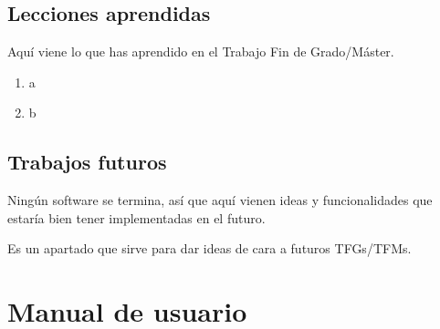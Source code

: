 \documentclass[a4paper, 12pt]{book}
\begin{document}
\section{Lecciones aprendidas}
\label{sec:lecciones_aprendidas}

Aquí viene lo que has aprendido en el Trabajo Fin de Grado/Máster.

\begin{enumerate}
  \item a
  \item b
\end{enumerate}


\section{Trabajos futuros}
\label{sec:trabajos_futuros}

Ningún software se termina, así que aquí vienen ideas y funcionalidades
que estaría bien tener implementadas en el futuro.

Es un apartado que sirve para dar ideas de cara a futuros TFGs/TFMs.



\cleardoublepage
\appendix
\chapter{Manual de usuario}
\label{app:manual}



\cleardoublepage


\end{document}
